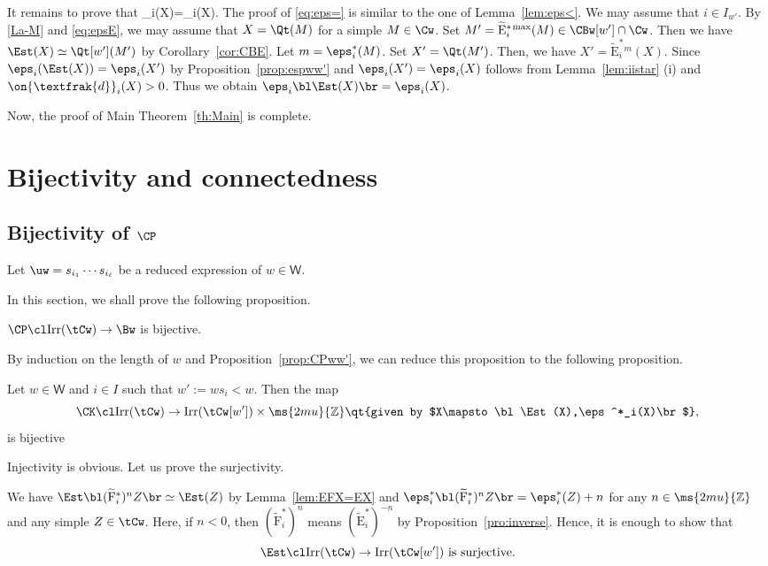 \documentclass[12pt,leqno]{amsart}%
\theoremstyle{plain}
\theoremstyle{definition}
\newcommand{\Z}{\ms{2mu}{\mathbb Z}}
\newcommand{\seteq}{\mathbin{:=}}
\newcommand{\de}{\on{\textfrak{d}}}
\newcommand{\weyl}{\mathsf{W}}  %
\newcommand{\tF}{\widetilde{\mathrm{F}}} 		%
\newcommand{\tE}{\widetilde{\mathrm{E}}} 		%
\newcommand{\tEs}{\widetilde{\mathrm{E}}^*} 		%
\newcommand{\tEsm}{\widetilde{\mathrm{E}}^{*{ \hskip 0.1em  \rm max}}}  		%
\newcommand{\Irr}{\mathrm{Irr}}
\numberwithin{equation}{section}
\begin{document}
\medskip
It remains to prove that
\eq\eps_i(X)=\eps_i(\Est X).\label{eq:eps=}
\eneq
The proof of \eqref{eq:eps=} is similar to the one of Lemma~\ref{lem:eps<}.
We may assume that $i\in I_{w'}$.
By {\eqref{La-M} and }\eqref{eq:epsE}, we may assume that $X=\Qt(M)$ for a simple $M\in\Cw$.
Set $M'=\tEsm_{i}(M)\in\CBw[w']\cap\Cw$.
Then we have $\Est(X)\simeq\Qt[w'](M')$ {by Corollary~\ref{cor:CBE}}.
Let $m=\eps_i^*(M)$.
Set $X'=\Qt(M')$.
Then, we have
$X'=\tEs_i{}^m(X)$.
Since $\eps_i(\Est(X))=\eps_i(X')$ by Proposition~\ref{prop:espww'}
and $\eps_i(X')=\eps_i(X)$ follows from Lemma~\ref{lem:iistar} (i)
and $\de_i(X)>0$.
Thus we obtain $\eps_i\bl\Est(X)\br=\eps_i(X)$.

Now, the proof of Main Theorem~\ref{th:Main} is complete.


\section{Bijectivity and connectedness}
\subsection{Bijectivity of $\CP$}
Let $\uw=s_{i_1}\cdots s_{i_\ell}$ be a reduced expression of $w\in \weyl$.

In this section, we shall prove the following proposition.

\Prop\label{prop:bij}
 $\CP\cl\Irr(\tCw)\to\Bw$ is bijective.
\enprop

By induction on the length of $w$
and Proposition~\ref{prop:CPww'}, we can reduce this proposition to the following proposition.

\Prop
Let $w\in \weyl$ and $i\in I$ such that $w'\seteq ws_i<w$.
Then the map
$$\CK\cl \Irr(\tCw)\to \Irr(\tCw[w'])\times\Z
\qt{given by $X\mapsto \bl\Est(X),\eps^*_i(X)\br$},$$
is bijective
\enprop


\Proof 
Injectivity is obvious.
Let us prove the surjectivity.

We have $\Est\bl(\tF^*_i)^nZ\br\simeq\Est(Z)$ by Lemma~\ref{lem:EFX=EX} 
and $\eps_i^*\bl(\tF^*_i)^nZ\br
=\eps_i^*(Z)+n$ for any $n\in\Z$ and any simple $Z\in\tCw$.
Here, if $n<0$, then $(\tF^*_i)^n$ means $(\tE^*_i)^{-n}$ 
by Proposition~\ref{pro:inverse}.
Hence, it is enough to show that
$$\text{$\Est\cl\Irr(\tCw)\to\Irr(\tCw[w'])$ is surjective.}$$
\end{document}
